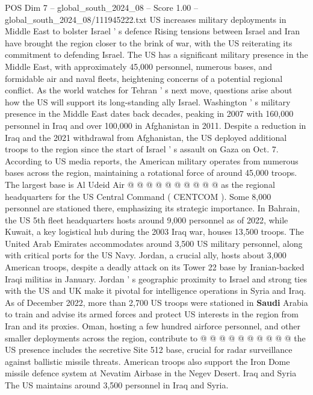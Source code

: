 \begin{textsample}{POS Dim 7 – global\_south\_2024\_08 – Score 1.00 – global\_south\_2024\_08/111945222.txt}  \label{ex:f7_pos_079}
US increases military deployments in Middle East to bolster Israel ' s defence Rising tensions between Israel and Iran have brought the region closer to the brink of war, with the US reiterating its commitment to defending Israel.
The US has a significant military presence in the Middle East, with approximately 45,000 personnel, numerous bases, and formidable air and naval fleets, heightening concerns of a potential regional conflict.
As the world watches for Tehran ' s next move, questions arise about how the US will support its long-standing ally Israel.
Washington ' s military presence in the Middle East dates back decades, peaking in 2007 with 160,000 personnel in Iraq and over 100,000 in Afghanistan in 2011.
Despite a reduction in Iraq and the 2021 withdrawal from Afghanistan, the US deployed additional troops to the region since the start of Israel ' s assault on Gaza on Oct. 7.
According to US media reports, the American military operates from numerous bases across the region, maintaining a rotational force of around 45,000 troops.
The largest base is Al Udeid Air @ @ @ @ @ @ @ @ @ @ as the regional headquarters for the US Central Command ( CENTCOM ).
Some 8,000 personnel are stationed there, emphasizing its strategic importance.
In Bahrain, the US 5th fleet headquarters hosts around 9,000 personnel as of 2022, while Kuwait, a key logistical hub during the 2003 Iraq war, houses 13,500 troops.
The United Arab Emirates accommodates around 3,500 US military personnel, along with critical ports for the US Navy.
Jordan, a crucial ally, hosts about 3,000 American troops, despite a deadly attack on its Tower 22 base by Iranian-backed Iraqi militias in January.
Jordan ' s geographic proximity to Israel and strong ties with the US and UK make it pivotal for intelligence operations in Syria and Iraq.
As of December 2022, more than 2,700 US troops were stationed in \textbf{Saudi} Arabia to train and advise its armed forces and protect US interests in the region from Iran and its proxies.
Oman, hosting a few hundred airforce personnel, and other smaller deployments across the region, contribute to @ @ @ @ @ @ @ @ @ @ the US presence includes the secretive Site 512 base, crucial for radar surveillance against ballistic missile threats.
American troops also support the Iron Dome missile defence system at Nevatim Airbase in the Negev Desert.
Iraq and Syria The US maintains around 3,500 personnel in Iraq and Syria.

\end{textsample}
